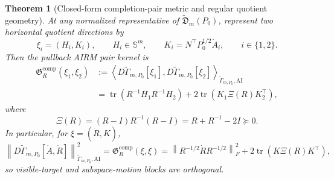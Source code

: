 \documentclass[10pt]{article}
\theoremstyle{plain}
\newtheorem{theorem}{Theorem}[section]
\theoremstyle{definition}
\theoremstyle{remark}
\newcommand{\Sym}{\mathbb S}
\newcommand{\AI}{\mathrm{AI}}
\newcommand{\tr}{\operatorname{tr}}
\newcommand{\fro}[1]{\left\lVert #1\right\rVert_F}
\newcommand{\norm}[1]{\left\lVert #1\right\rVert}
\newcommand{\Xiop}{\Xi}
\begin{document}
\begin{theorem}[Closed-form completion-pair metric and regular quotient geometry]
\label{thm:stratified-line-element}
At any normalized representative of
\(\widetilde{\mathfrak D}_m(P_0)\), represent two horizontal quotient
directions by
\[
  \xi_i=(H_i,K_i),
  \qquad H_i\in\Sym^m,
  \qquad K_i=N^\top P_0^{1/2}\dot A_i,
  \qquad i\in\{1,2\}.
\]
Then the pullback AIRM pair kernel is
\begin{equation}
  \boxed{
  \begin{aligned}
  \mathfrak G_R^{\mathrm{comp}}(\xi_1,\xi_2)
  &:={}
  \left\langle
  D\widetilde\Gamma_{m,P_0}[\xi_1],
  D\widetilde\Gamma_{m,P_0}[\xi_2]
  \right\rangle_{\widetilde\Gamma_{m,P_0},\AI}
  \\
  &={}
  \tr(R^{-1}H_1R^{-1}H_2)
  +2\tr\!\left(K_1\Xiop(R)K_2^\top\right),
  \end{aligned}}
  \label{eq:completion-pair-kernel}
\end{equation}
where
\begin{equation}
  \Xiop(R)=(R-I)R^{-1}(R-I)=R+R^{-1}-2I\succeq0.
  \label{eq:mismatch-weight}
\end{equation}
In particular, for \(\xi=(\dot R,K)\),
\begin{equation}
  \boxed{
  \norm{D\widetilde\Gamma_{m,P_0}[\dot A,\dot R]}_{\widetilde\Gamma_{m,P_0},\AI}^2
  =\mathfrak G_R^{\mathrm{comp}}(\xi,\xi)
  =
  \fro{R^{-1/2}\dot R R^{-1/2}}^2
  +2\tr\!\left(K\Xiop(R)K^\top\right),}
  \label{eq:stratified-line-element}
\end{equation}
so visible-target and subspace-motion blocks are orthogonal.


\end{theorem}
\end{document}
